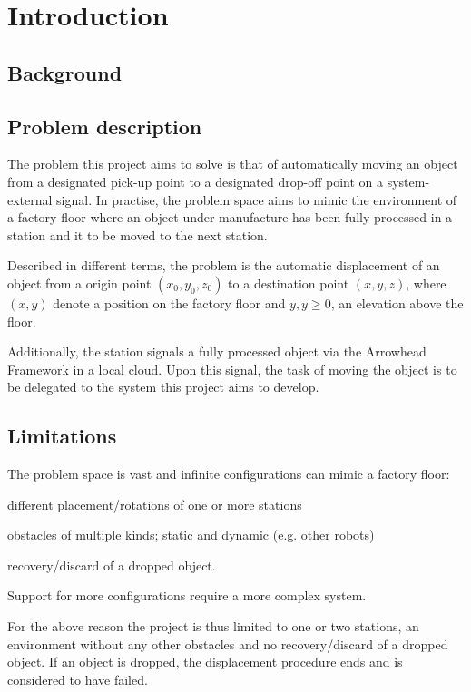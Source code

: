 \section{Introduction}
\subsection{Background}

\subsection{Problem description}
The problem this project aims to solve is that of automatically moving an object from a designated pick-up point to a designated drop-off point on a system-external signal.
In practise, the problem space aims to mimic the environment of a factory floor where an object under manufacture has been fully processed in a station and it to be moved to the next station.

Described in different terms, the problem is the automatic displacement of an object from a origin point $(x_0, y_0, z_0)$ to a destination point $(x, y, z)$,
where $(x, y)$ denote a position on the factory floor and $y, y \geq 0$, an elevation above the floor.

Additionally, the station signals a fully processed object via the Arrowhead Framework in a local cloud.
Upon this signal, the task of moving the object is to be delegated to the system this project aims to develop.


\subsection{Limitations}
The problem space is vast and infinite configurations can mimic a factory floor:
\begin{inline-enum}
    \item different placement/rotations of one or more stations
    \item obstacles of multiple kinds; static and dynamic (e.g. other robots)
    \item recovery/discard of a dropped object.
\end{inline-enum}
Support for more configurations require a more complex system.

For the above reason the project is thus limited to one or two stations,
an environment without any other obstacles and no recovery/discard of a dropped object.
If an object is dropped, the displacement procedure ends and is considered to have failed.

